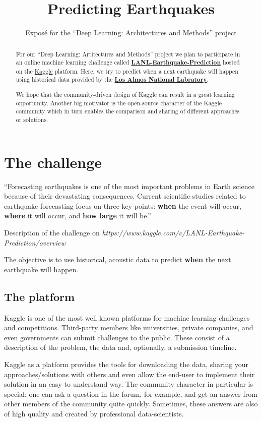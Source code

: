 \documentclass[colorback,accentcolor=tud9c,12pt]{tudreport}
\title{Predicting Earthquakes}
\subtitle{Expos\'{e} for the ``Deep Learning: Architectures and Methods'' project}
\begin{document}
	\maketitle
	\begin{abstract}
		For our ``Deep Learning: Artitectures and Methods'' project we plan to participate in an online machine learning challenge called 
		\textbf{\href{https://www.kaggle.com/c/LANL-Earthquake-Prediction/overview}{LANL-Earthquake-Prediction}} hosted on the \href{https://www.kaggle.com}{Kaggle} platform.
		Here, we try to predict when a next earthquake will happen using historical data provided by the \textbf{\href{https://www.lanl.gov/}{Los Almos National Labratory}}.
		
		We hope that the community-driven design of Kaggle can result in a great learning opportunity.
		Another big motivator is the open-source character of the Kaggle community which in turn enables the comparison and sharing of different approaches or solutions.
	\end{abstract}

	\chapter{The challenge}
	
	\epigraph{``Forecasting earthquakes is one of the most important problems in Earth science because of their devastating consequences. Current scientific studies related to earthquake forecasting focus on three key points: \textbf{when} the event will occur, \textbf{where} it will occur, and \textbf{how large} it will be.''}{Description of the challenge on \textit{https://www.kaggle.com/c/LANL-Earthquake-Prediction/overview}}
	
	The objective is to use historical, acoustic data to predict \textbf{when} the next earthquake will happen.
	
	
	\section{The platform}
	Kaggle is one of the most well known platforms for machine learning challenges and competitions.
	Third-party members like universities, private companies, and even governments can submit challenges to the public. These consist of a description of the problem, the data and, optionally, a submission timeline.
	
	Kaggle as a platform provides the tools for downloading the data, sharing your approaches/solutions with others and even allow the end-user to implement their solution in an easy to understand way.
	The community character in particular is special: one can ask a question in the forum, for example, and get an answer from other members of the community quite quickly. Sometimes, these answers are also of high quality and created by professional data-scientists.
	
\end{document}
